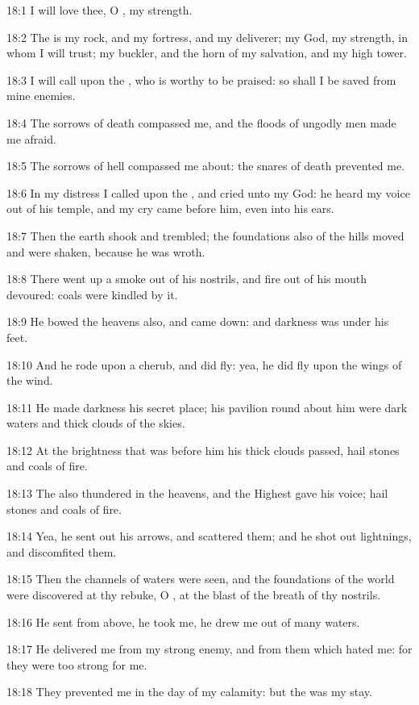 18:1 I will love thee, O \LORD, my strength.

18:2 The \LORD is my rock, and my fortress, and my deliverer; my God, my strength, in whom I will trust; my buckler, and the horn of my salvation, and my high tower.

18:3 I will call upon the \LORD, who is worthy to be praised: so shall I be saved from mine enemies.

18:4 The sorrows of death compassed me, and the floods of ungodly men made me afraid.

18:5 The sorrows of hell compassed me about: the snares of death prevented me.

18:6 In my distress I called upon the \LORD, and cried unto my God: he heard my voice out of his temple, and my cry came before him, even into his ears.

18:7 Then the earth shook and trembled; the foundations also of the hills moved and were shaken, because he was wroth.

18:8 There went up a smoke out of his nostrils, and fire out of his mouth devoured: coals were kindled by it.

18:9 He bowed the heavens also, and came down: and darkness was under his feet.

18:10 And he rode upon a cherub, and did fly: yea, he did fly upon the wings of the wind.

18:11 He made darkness his secret place; his pavilion round about him were dark waters and thick clouds of the skies.

18:12 At the brightness that was before him his thick clouds passed, hail stones and coals of fire.

18:13 The \LORD also thundered in the heavens, and the Highest gave his voice; hail stones and coals of fire.

18:14 Yea, he sent out his arrows, and scattered them; and he shot out lightnings, and discomfited them.

18:15 Then the channels of waters were seen, and the foundations of the world were discovered at thy rebuke, O \LORD, at the blast of the breath of thy nostrils.

18:16 He sent from above, he took me, he drew me out of many waters.

18:17 He delivered me from my strong enemy, and from them which hated me: for they were too strong for me.

18:18 They prevented me in the day of my calamity: but the \LORD was my stay.

